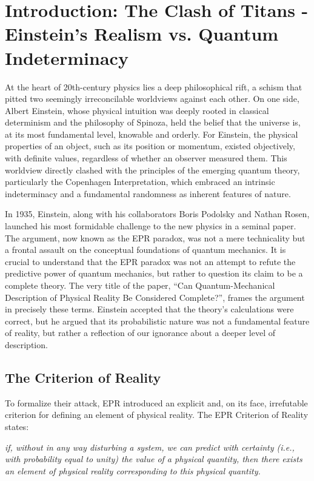 \section{Introduction: The Clash of Titans - Einstein's Realism vs. Quantum Indeterminacy}

At the heart of 20th-century physics lies a deep philosophical rift, a schism that pitted two seemingly irreconcilable worldviews against each other.
On one side, Albert Einstein, whose physical intuition was deeply rooted in classical determinism and the philosophy of Spinoza, held the belief that 
the universe is, at its most fundamental level, knowable and orderly. For Einstein, the physical properties of an object, such as its position or momentum, 
existed objectively, with definite values, regardless of whether an observer measured them. This worldview directly clashed with the principles of the emerging 
quantum theory, particularly the Copenhagen Interpretation, which embraced an intrinsic indeterminacy and a fundamental randomness as inherent features of nature.

In 1935, Einstein, along with his collaborators Boris Podolsky and Nathan Rosen, launched his most formidable challenge to the new physics in a seminal paper. 
The argument, now known as the EPR paradox, was not a mere technicality but a frontal assault on the conceptual foundations of quantum mechanics. It is crucial 
to understand that the EPR paradox was not an attempt to refute the predictive power of quantum mechanics, but rather to question its claim to be a complete theory. 
The very title of the paper, ``Can Quantum-Mechanical Description of Physical Reality Be Considered Complete?'', frames the argument in precisely these terms. Einstein
accepted that the theory's calculations were correct, but he argued that its probabilistic nature was not a fundamental feature of reality, but rather a reflection of 
our ignorance about a deeper level of description.

\subsection{The Criterion of Reality}

To formalize their attack, EPR introduced an explicit and, on its face, irrefutable criterion for defining an element of physical reality. The EPR Criterion of Reality states:

\textit{if, without in any way disturbing a system, we can predict with certainty (i.e., with probability equal to unity) the value of a physical quantity, then there 
exists an element of physical reality corresponding to this physical quantity.}

